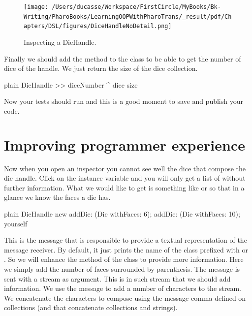 \documentclass[10pt,twoside,english]{_support/latex/sbabook/sbabook}
\begin{document}
\begin{figure}

\begin{center}
\texttt{[image: /Users/ducasse/Workspace/FirstCircle/MyBooks/Bk-Writing/PharoBooks/LearningOOPWithPharoTrans/\_result/pdf/Chapters/DSL/figures/DiceHandleNoDetail.png]}\caption{Inspecting a DieHandle.\label{DieHandleNoDetail}}\end{center}
\end{figure}


Finally we should add the method  to the  class to be able to get the number of dice of the handle. We just return the size of the dice collection.

\begin{displaycode}{plain}
DieHandle >> diceNumber  
	^ dice size
\end{displaycode}

Now your tests should run and this is a good moment to save and publish your code. 
\section{Improving programmer experience}
Now when you open an inspector you cannot see well the dice that compose the die handle. Click on the  instance variable and you will only get a list of  without further information. What we would like to get is something like  or  so that in a glance we know the faces a die has. 

\begin{displaycode}{plain}
DieHandle new 
	addDie: (Die withFaces: 6);
	addDie: (Die withFaces: 10);
	yourself
\end{displaycode}

This is the  message  that is responsible to provide a textual representation of the message receiver. By default, it just prints the name of the class prefixed with  or . So we will enhance the  method of the  class to provide more information. Here we simply add the number of faces surrounded by parenthesis. The  message is sent with a stream as argument. This is in such stream that we should add information. We use the message  to add a number of characters to the stream. We concatenate the characters to compose \textcode{()} using the message \textcode{,} comma defined on collections (and that concatenate collections and strings).
\end{document}
